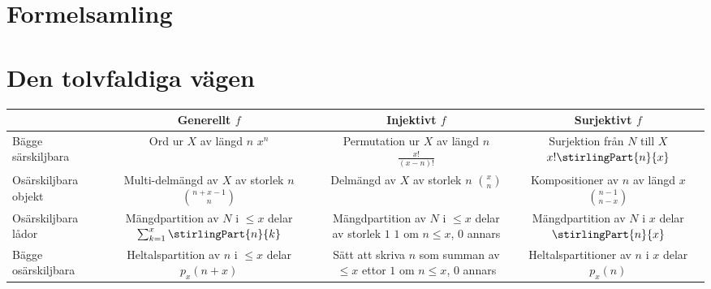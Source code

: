 \documentclass[nobib]{tufte-handout}
\begin{document}
\pagebreak

\section{Formelsamling}

\section{Den tolvfaldiga vägen}

\begin{fullwidth}
  \begin{tabularx}{\linewidth}{l|ccc}
    & Generellt $f$ & Injektivt $f$ & Surjektivt $f$\\
    \midrule
    Bägge särskiljbara & \specialcell{Ord ur $X$ av längd $n$\\ $x^n$} & \specialcell{Permutation ur $X$ av längd $n$\\ $\frac{x!}{(x-n)!}$} & \specialcell{Surjektion från $N$ till $X$\\$x!\stirlingPart{n}{x}$} \\
    Osärskiljbara objekt & \specialcell{Multi-delmängd av $X$\\ av storlek $n$\\$\binom{n + x - 1}{n}$} & \specialcell{Delmängd av $X$ av storlek $n$\\$\binom{x}{n}$} & \specialcell{Kompositioner av $n$\\av längd $x$\\$\binom{n - 1}{n - x}$} \\
    Osärskiljbara lådor & \specialcell{Mängdpartition av $N$\\ i $\leq x$ delar \\$\sum_{k=1}^{x} \stirlingPart{n}{k}$} & \specialcell{Mängdpartition av $N$\\ i $\leq x$ delar av storlek $1$\\$1$ om $n \leq x$, $0$ annars} & \specialcell{Mängdpartition av $N$\\i $x$ delar\\$\stirlingPart{n}{x}$} \\
    Bägge osärskiljbara & \specialcell{Heltalspartition av $n$ i $\leq x$ delar\\$p_x(n + x)$} & \specialcell{Sätt att skriva $n$ som\\summan av $\leq x$ ettor\\$1$ om $n \leq x$, $0$ annars} & \specialcell{Heltalspartitioner av $n$\\ i $x$ delar \\$p_x(n)$} 
  \end{tabularx}
\end{fullwidth}
\end{document}
